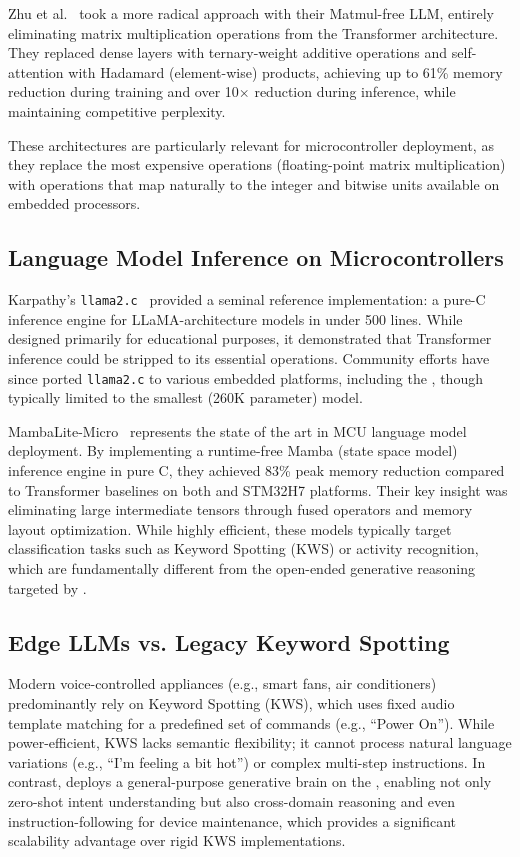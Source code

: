Zhu et al.~\cite{zhu2024matmulfree} took a more radical approach with their
Matmul-free LLM, entirely eliminating matrix multiplication operations from
the Transformer architecture. They replaced dense layers with ternary-weight
additive operations and self-attention with Hadamard (element-wise) products,
achieving up to 61\% memory reduction during training and over 10$\times$
reduction during inference, while maintaining competitive perplexity.

These architectures are particularly relevant for microcontroller deployment,
as they replace the most expensive operations (floating-point matrix
multiplication) with operations that map naturally to the integer and bitwise
units available on embedded processors.

\subsection{Language Model Inference on Microcontrollers}

Karpathy's \texttt{llama2.c}~\cite{karpathy2023llama2c} provided a seminal
reference implementation: a pure-C inference engine for LLaMA-architecture
models in under 500 lines. While designed primarily for educational purposes,
it demonstrated that Transformer inference could be stripped to its essential
operations. Community efforts have since ported \texttt{llama2.c} to various
embedded platforms, including the \espss{}, though typically limited to the
smallest (260K parameter) model.

MambaLite-Micro~\cite{mambalite2024} represents the state of the art in MCU
language model deployment. By implementing a runtime-free Mamba (state space
model) inference engine in pure C, they achieved 83\% peak memory reduction
compared to Transformer baselines on both \espss{} and STM32H7 platforms.
Their key insight was eliminating large intermediate tensors through fused operators and memory layout optimization. While highly efficient, these models typically target classification tasks such as Keyword Spotting (KWS) or activity recognition, which are fundamentally different from the open-ended generative reasoning targeted by \tinybit{}.

\subsection{Edge LLMs vs. Legacy Keyword Spotting}

Modern voice-controlled appliances (e.g., smart fans, air conditioners) predominantly rely on Keyword Spotting (KWS), which uses fixed audio template matching for a predefined set of commands (e.g., ``Power On''). While power-efficient, KWS lacks semantic flexibility; it cannot process natural language variations (e.g., ``I'm feeling a bit hot'') or complex multi-step instructions. In contrast, \tinybit{} deploys a general-purpose generative brain on the \espss{}, enabling not only zero-shot intent understanding but also cross-domain reasoning and even instruction-following for device maintenance, which provides a significant scalability advantage over rigid KWS implementations.

